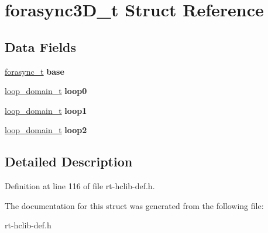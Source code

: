 \hypertarget{structforasync3D__t}{\section{forasync3\-D\-\_\-t Struct Reference}
\label{structforasync3D__t}
}
\subsection*{Data Fields}
\begin{DoxyCompactItemize}
\item 
\hypertarget{structforasync3D__t_a634128b077e376da001fa879068a4880}{\hyperlink{structforasync__t}{forasync\-\_\-t} {\bfseries base}}\label{structforasync3D__t_a634128b077e376da001fa879068a4880}

\item 
\hypertarget{structforasync3D__t_accb7cd7a6dbbae97ae9985b0fad0f1d0}{\hyperlink{structloop__domain__t}{loop\-\_\-domain\-\_\-t} {\bfseries loop0}}\label{structforasync3D__t_accb7cd7a6dbbae97ae9985b0fad0f1d0}

\item 
\hypertarget{structforasync3D__t_a5e83969fadb0cf427282395221586c6b}{\hyperlink{structloop__domain__t}{loop\-\_\-domain\-\_\-t} {\bfseries loop1}}\label{structforasync3D__t_a5e83969fadb0cf427282395221586c6b}

\item 
\hypertarget{structforasync3D__t_ab450e673bb506ec8b3a62a27019c0d27}{\hyperlink{structloop__domain__t}{loop\-\_\-domain\-\_\-t} {\bfseries loop2}}\label{structforasync3D__t_ab450e673bb506ec8b3a62a27019c0d27}

\end{DoxyCompactItemize}


\subsection{Detailed Description}


Definition at line 116 of file rt-\/hclib-\/def.\-h.



The documentation for this struct was generated from the following file\-:\begin{DoxyCompactItemize}
\item 
rt-\/hclib-\/def.\-h\end{DoxyCompactItemize}
